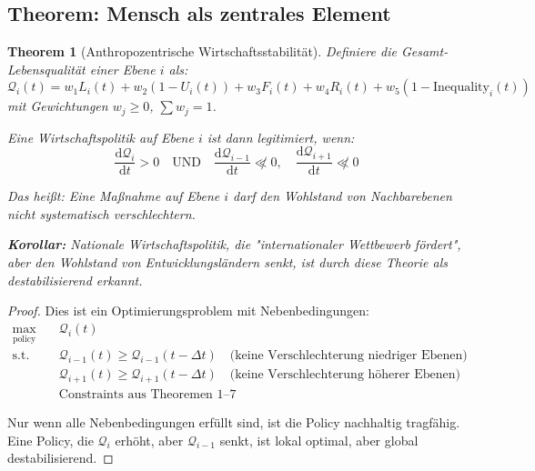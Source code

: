 \documentclass[a4paper, 12pt, twoside, openright]{report}
\newtheorem{theorem}{Theorem}[section]
\theoremstyle{definition}
\theoremstyle{definition}
\begin{document}
\subsection{Theorem: Mensch als zentrales Element}

\begin{theorem}[Anthropozentrische Wirtschaftsstabilität]
\label{thm:anthropozentrismus}
Definiere die Gesamt-Lebensqualität einer Ebene $i$ als:
\begin{equation}
\mathcal{Q}_i(t) = w_1 L_i(t) + w_2 (1-U_i(t)) + w_3 F_i(t) + w_4 R_i(t) + w_5 (1-\text{Inequality}_i(t))
\end{equation}
mit Gewichtungen $w_j \geq 0$, $\sum w_j = 1$.

Eine Wirtschaftspolitik auf Ebene $i$ ist dann legitimiert, wenn:
\begin{equation}
\frac{\mathrm{d}\mathcal{Q}_i}{\mathrm{d}t} > 0 \quad \text{UND} \quad \frac{\mathrm{d}\mathcal{Q}_{i-1}}{\mathrm{d}t} \not\ll 0, \quad \frac{\mathrm{d}\mathcal{Q}_{i+1}}{\mathrm{d}t} \not\ll 0
\end{equation}

Das heißt: Eine Maßnahme auf Ebene $i$ darf den Wohlstand von Nachbarebenen nicht systematisch verschlechtern.

\textbf{Korollar:} Nationale Wirtschaftspolitik, die "internationaler Wettbewerb fördert", aber den Wohlstand von Entwicklungsländern senkt, ist durch diese Theorie als destabilisierend erkannt.
\end{theorem}

\begin{proof}
Dies ist ein Optimierungsproblem mit Nebenbedingungen:
\begin{align}
\max_{\text{policy}} \quad &\mathcal{Q}_i(t) \\
\text{s.t.} \quad &\mathcal{Q}_{i-1}(t) \geq \mathcal{Q}_{i-1}(t-\Delta t) \quad \text{(keine Verschlechterung niedriger Ebenen)} \\
&\mathcal{Q}_{i+1}(t) \geq \mathcal{Q}_{i+1}(t-\Delta t) \quad \text{(keine Verschlechterung höherer Ebenen)} \\
&\text{Constraints aus Theoremen 1--7}
\end{align}

Nur wenn alle Nebenbedingungen erfüllt sind, ist die Policy nachhaltig tragfähig. Eine Policy, die $\mathcal{Q}_i$ erhöht, aber $\mathcal{Q}_{i-1}$ senkt, ist lokal optimal, aber global destabilisierend.
\end{proof}
\end{document}

